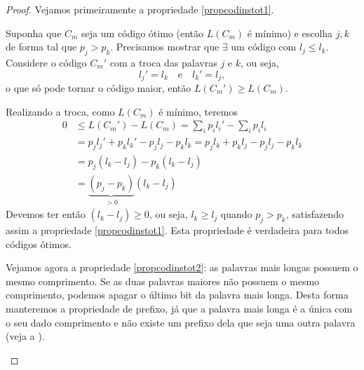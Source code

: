 \begin{proof}
Vejamos primeiramente a propriedade \ref{propcodinstot1}.

Suponha que $C_m$ seja um código ótimo (então $L(C_m)$ é mínimo) e escolha $j,k$ de forma tal que $p_j > p_k$.
Precisamos mostrar que $\exists$ um código com $l_j \leq l_k$.
Considere o código $C_m'$ com a troca das palavras $j$ e $k$, ou seja,
\begin{equation}
  l_j' = l_k \quad \text{e} \quad l_k' = l_j ,
\end{equation}
o que só pode tornar o código maior, então $L(C_m') \geq L(C_m)$.

Realizando a troca, como $L(C_m)$ é mínimo, teremos
\begin{subequations}
  \begin{align}
    0 &\leq L(C_m') - L(C_m) = \sum_i p_i l_i' - \sum_i p_i l_i \\
      &= p_j l_j' + p_k l_k' - p_j l_j - p_k l_k = p_j l_k + p_k l_j - p_j l_j - p_k l_k \\
      &= p_j (l_k - l_j) - p_k (l_k - l_j) \\
      &= \underbrace{(p_j - p_k)}_{>0}  (l_k - l_j)
  \end{align}
\end{subequations}
Devemos ter então $(l_k - l_j) \geq 0$, ou seja, $l_k \geq l_j$ quando $p_j > p_k$, satisfazendo assim a propriedade \ref{propcodinstot1}.
Esta propriedade é verdadeira para todos códigos ótimos.

Vejamos agora a propriedade \ref{propcodinstot2}: as palavras mais longas possuem o mesmo comprimento.
Se as duas palavras maiores não possuem o mesmo comprimento, podemos apagar o último bit da palavra mais longa.
Desta forma manteremos a propriedade de prefixo, já que a palavra mais longa é a única com o seu dado comprimento e não
existe um prefixo dela que seja uma outra palavra (veja a ).
 \begin{figure}[h!]
 \centering
\end{figure}
\end{proof}
